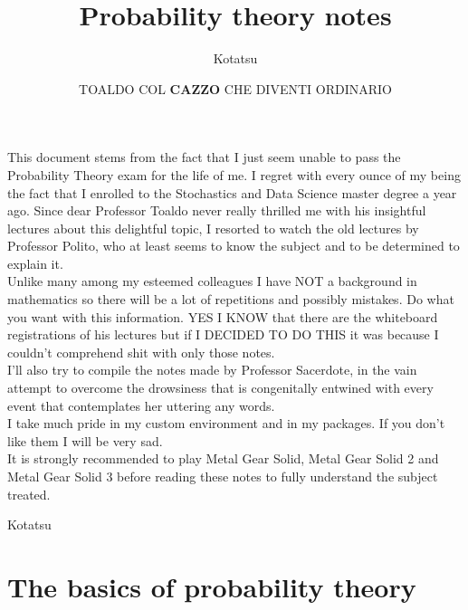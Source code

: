 \documentclass{report}
\begin{document}
	\title{Probability theory notes}
	\author{Kotatsu}
	\date{\small TOALDO COL \textbf{CAZZO} CHE DIVENTI ORDINARIO}
	\maketitle
	\begin{preface}
		This document stems from the fact that I just seem unable to pass the Probability Theory exam for the life of me. I regret with every ounce of my being the fact that I enrolled to the Stochastics and Data Science master degree a year ago. Since dear Professor Toaldo never really thrilled me with his insightful lectures about this delightful topic, I resorted to watch the old lectures by Professor Polito, who at least seems to know the subject and to be determined to explain it.\\
		Unlike many among my esteemed colleagues I have NOT a background in mathematics so there will be a lot of repetitions and possibly mistakes. Do what you want with this information. YES I KNOW that there are the whiteboard registrations of his lectures but if I DECIDED TO DO THIS it was because I couldn't comprehend shit with only those notes.\\
		I'll also try to compile the notes made by Professor Sacerdote, in the vain attempt to overcome the drowsiness that is congenitally entwined with every event that contemplates her uttering any words.\\
		I take much pride in my custom environment and in my packages. If you don't like them I will be very sad. \\
		It is strongly recommended to play Metal Gear Solid, Metal Gear Solid 2 and Metal Gear Solid 3 before reading these notes to fully understand the subject treated.
		
		\vskip1.2cm
		
		\hfill Kotatsu
	\end{preface}
	\tableofcontents
	\chapter{The basics of probability theory}
\end{document}
